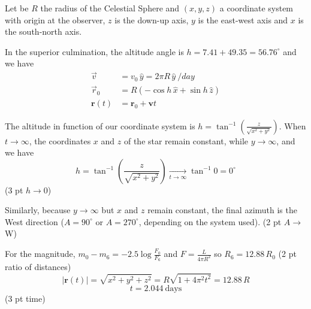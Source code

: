 Let be $R$ the radius of the Celestial Sphere and $(x, y, z)$ a coordinate
system with origin at the observer, $z$ is the down-up axis, $y$ is the
east-west axis and $x$ is the south-north axis.

In the superior culmination, the altitude angle is
$h = 7.41 + 49.35 = 56.76^\circ$ and we have
\begin{align*}
  \vec{v} &= v_0\,\hat{y} = 2\pi R\,\hat{y}\ /day \\
  \vec{r}_0 &= R(-\cos h\,\hat{x} + \sin h\,\hat{z}) \\
  \mathbf{r}(t) &= \mathbf{r}_0 + \mathbf{v}t
\end{align*}

The altitude in function of our coordinate system is
$h = \tan^{-1}\left(\frac{z}{\sqrt{x^2 + y^2}}\right)$. When $t \to \infty$,
the coordinates $x$ and $z$ of the star remain constant, while
$y \to \infty$, and we have
\[
  h = \tan^{-1}\left(\frac{z}{\sqrt{x^2 + y^2}}\right)
    \xrightarrow[t \to \infty]{} \tan^{-1} 0 = 0^\circ
\]
\hfill(3 pt $h \to 0$)

Similarly, because $y \to \infty$ but $x$ and $z$ remain constant, the final
azimuth is the West direction ($A = 90^\circ$ or $A = 270^\circ$, depending on
the system used).
\hfill(2 pt $A \to$ W)

For the magnitude,
$m_0 - m_6 = -2.5\log\frac{F_0}{F_6}$ and $F = \frac{L}{4\pi R^2}$ so
$R_6 = 12.88\,R_0$
\hfill(2 pt ratio of distances)
\[
  |\mathbf{r}(t)| = \sqrt{x^2 + y^2 + z^2} = R\sqrt{1 + 4\pi^2 t^2} = 12.88\,R
\]
\[
  t = 2.044\ \text{days}
\]
\hfill(3 pt time)
